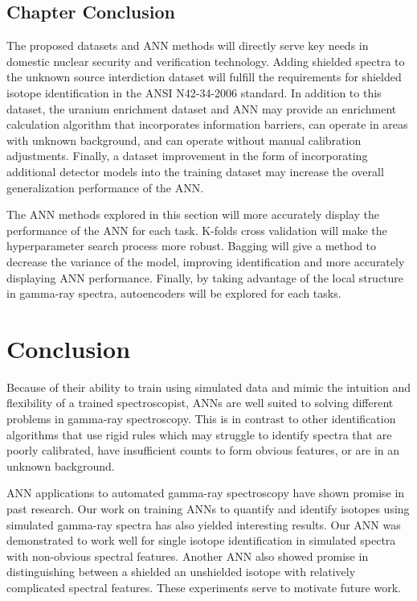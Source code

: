 \documentclass[tocnosub,noragright,centerchapter,12pt,fullpage]{uiucecethesis09}
\begin{document}
\section{Chapter Conclusion}

The proposed datasets and ANN methods will directly serve key needs in domestic nuclear security and verification technology. Adding shielded spectra to the unknown source interdiction dataset will fulfill the requirements for shielded isotope identification in the ANSI N42-34-2006 standard. In addition to this dataset, the uranium enrichment dataset and ANN may provide an enrichment calculation algorithm that incorporates information barriers, can operate in areas with unknown background, and can operate without manual calibration adjustments. Finally, a dataset improvement in the form of incorporating additional detector models into the training dataset may increase the overall generalization performance of the ANN. 

The ANN methods explored in this section will more accurately display the performance of the ANN for each task. K-folds cross validation will make the hyperparameter search process more robust. Bagging will give a method to decrease the variance of the model, improving identification and more accurately displaying ANN performance. Finally, by taking advantage of the local structure in gamma-ray spectra, autoencoders will be explored for each tasks. 



\chapter{Conclusion}

Because of their ability to train using simulated data and mimic the intuition and flexibility of a trained spectroscopist, ANNs are well suited to solving different problems in gamma-ray spectroscopy. This is in contrast to other identification algorithms that use rigid rules which may struggle to identify spectra that are poorly calibrated, have insufficient counts to form obvious features, or are in an unknown background. 

ANN applications to automated gamma-ray spectroscopy have shown promise in past research. Our work on training ANNs to quantify and identify isotopes using simulated gamma-ray spectra has also yielded interesting results. Our ANN was demonstrated to work well for single isotope identification in simulated spectra with non-obvious spectral features. Another ANN also showed promise in distinguishing between a shielded an unshielded isotope with relatively complicated spectral features. These experiments serve to motivate future work.
\end{document}
